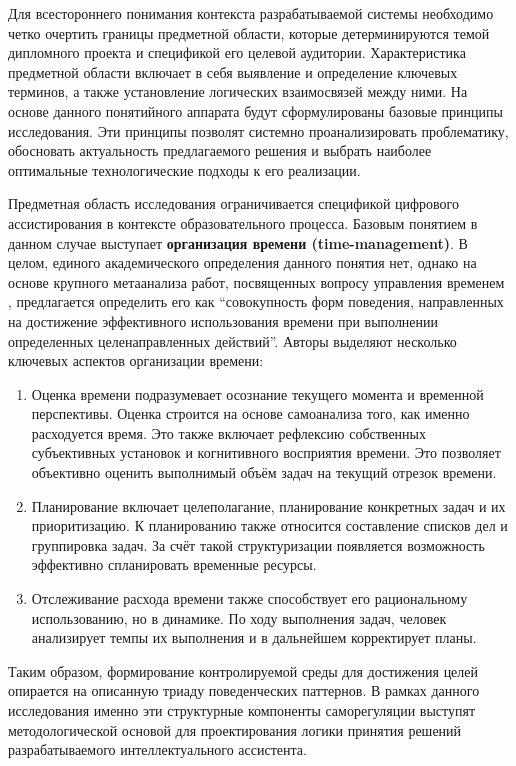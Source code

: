Для всестороннего понимания контекста разрабатываемой системы необходимо четко очертить границы предметной области, которые детерминируются темой дипломного проекта и спецификой его целевой аудитории. Характеристика предметной области включает в себя выявление и определение ключевых терминов, а также установление логических взаимосвязей между ними. На основе данного понятийного аппарата будут сформулированы базовые принципы исследования. Эти принципы позволят системно проанализировать проблематику, обосновать актуальность предлагаемого решения и выбрать наиболее оптимальные технологические подходы к его реализации.


\numberedparagraph
Предметная область исследования ограничивается спецификой цифрового ассистирования в контексте образовательного процесса. Базовым понятием в данном случае выступает \textbf{организация времени (time-management)}. В целом, единого академического определения данного понятия нет, однако на основе крупного метаанализа работ, посвященных вопросу управления временем \cite{Time-managemnet_review}, предлагается определить его как ``совокупность форм поведения, направленных на достижение эффективного использования времени при выполнении определенных целенаправленных действий''. Авторы выделяют несколько ключевых аспектов организации времени:   
\begin{enumerate}[label=\arabic*]
    \item Оценка времени подразумевает осознание текущего момента и временной перспективы. Оценка строится на основе самоанализа того, как именно расходуется время. Это также включает рефлексию собственных субъективных установок и когнитивного восприятия времени. Это позволяет объективно оценить выполнимый объём задач на текущий отрезок времени.
    \item Планирование включает целеполагание, планирование конкретных задач и их приоритизацию. К планированию также относится составление списков дел и группировка задач. За счёт такой структуризации появляется возможность эффективно спланировать временные ресурсы.
    \item Отслеживание расхода времени также способствует его рациональному использованию, но в динамике. По ходу выполнения задач, человек анализирует темпы их выполнения и в дальнейшем корректирует планы.
\end{enumerate}

Таким образом, формирование контролируемой среды для достижения целей опирается на описанную триаду поведенческих паттернов. В рамках данного исследования именно эти структурные компоненты саморегуляции выступят методологической основой для проектирования логики принятия решений разрабатываемого интеллектуального ассистента. 

